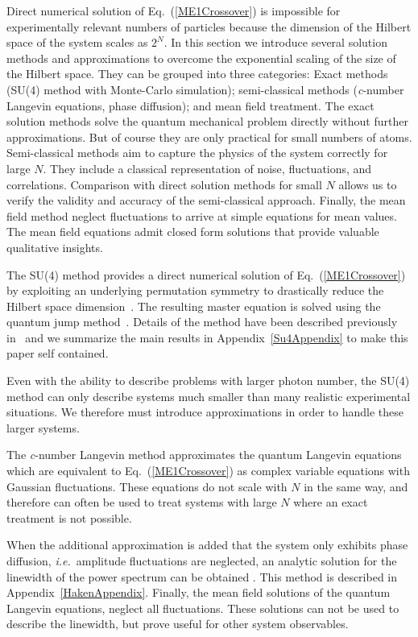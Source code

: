 \documentclass[aps,
twocolumn,
showpacs,
superscriptaddress,groupedaddress]{revtex4}
\begin{document}
Direct numerical solution of Eq.~(\ref{ME1Crossover}) is impossible for
experimentally relevant numbers of particles because the dimension of
the Hilbert space of the system scales as $2^N$.  In this section we
introduce several solution methods and approximations to overcome the
exponential scaling of the size of the Hilbert space.  They can be
grouped into three categories: Exact methods (SU(4) method with
Monte-Carlo simulation); semi-classical methods ({\it c}-number Langevin
equations, phase diffusion); and mean field
treatment.  The exact solution methods solve the quantum mechanical
problem directly without further approximations.  But of course they are
only practical for small numbers of atoms.  Semi-classical methods aim
to capture the physics of the system correctly for large $N$.  They
include a classical representation of noise, fluctuations, and
correlations.  Comparison with direct solution methods for small $N$
allows us to verify the validity and accuracy of the semi-classical
approach.  Finally, the mean field method neglect fluctuations to arrive
at simple equations for mean values.  The mean field equations admit
closed form solutions that provide valuable qualitative insights.

The SU(4) method provides a direct numerical solution of
Eq.~(\ref{ME1Crossover}) by exploiting an underlying permutation
symmetry to drastically reduce the Hilbert space
dimension~\cite{Hartmann:arXiv1201.1732, PhysRevA.87.062101}.  The
resulting master equation is solved using the quantum jump
method~\cite{Dalibard92,Dum92,Knight98}.  Details of the method have
been described previously in~\cite{PhysRevA.87.062101} and we summarize
the main results in Appendix~\ref{Su4Appendix} to make this paper self
contained.

Even with the ability to describe problems with larger photon number, the SU(4) method can only describe systems much smaller than many realistic experimental situations. We therefore must introduce approximations in order to handle these larger systems.

The {\it c}-number Langevin method \cite{Scully97, PhysRevA.47.1431} approximates the quantum
Langevin equations which are equivalent to Eq.~(\ref{ME1Crossover}) as complex variable equations with Gaussian fluctuations.
These equations do not scale with $N$ in the same way, and therefore can often be used to treat systems with large $N$ where an exact treatment is not possible. 

When the additional approximation is added that the system only exhibits phase diffusion, {\em i.e.}\ amplitude fluctuations are neglected, an analytic solution for the linewidth of the power spectrum can be obtained \cite{HakenLaser, HakenLaserBook}. This method is described in Appendix~\ref{HakenAppendix}.
Finally, the mean field solutions of the quantum Langevin equations, neglect all fluctuations. These solutions 
can not be used to describe the linewidth, but prove useful for other system observables.
\end{document}
